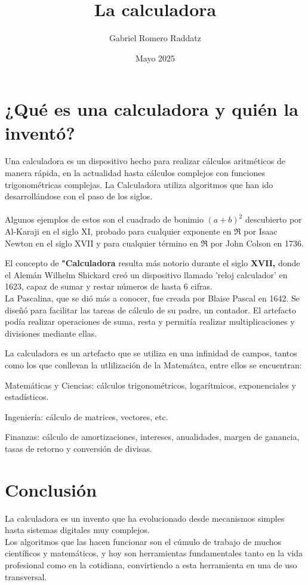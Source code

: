 \documentclass[12pt]{article}
\title{\textbf{\huge La calculadora}}
\author{ Gabriel Romero Raddatz}
\date{Mayo 2025}
\begin{document}
\maketitle

\section{¿Qué es una calculadora y quién la inventó?}

\begin{flushleft}
    
Una calculadora es un dispositivo hecho para realizar cálculos aritméticos de manera rápida, en la actualidad hasta cálculos complejos con funciones trigonométricas complejas. La Calculadora utiliza algoritmos que han ido desarrollándose con el paso de los siglos. \\
\\
Algunos ejemplos de estos son el cuadrado de bonimio $(a+b)^{2}$  descubierto por Al-Karaji en el siglo XI, probado para cualquier exponente en $\Re$ por Isaac Newton en el siglo XVII y para cualquier término en $\Re$ por John Colson en 1736. 


El concepto de \textbf{"Calculadora} resulta más notorio durante el siglo \textbf{XVII, } donde el Alemán Wilhelm Shickard creó un dispositivo llamado 'reloj calculador' en 1623, capaz de sumar y restar números de hasta 6 cifras. \\


La Pascalina, que se dió más a conocer, fue creada por Blaise Pascal en 1642. Se diseñó para facilitar las tareas de cálculo de su padre, un contador. El artefacto podía realizar operaciones de suma, resta y permitía realizar multiplicaciones y divisiones mediante ellas.





La calculadora es un artefacto que se utiliza en una infinidad de campos, tantos como los que conllevan la utlilización de la Matemátca, entre ellos se encuentran:  


Matemáticas y Ciencias: cálculos trigonométricos, logarítmicos, exponenciales y estadísticos.


Ingeniería: cálculo de matrices, vectores, etc.

Finanzas: cálculo de amortizaciones, intereses, anualidades, margen de ganancia, tasas de retorno y conversión de divisas.



\section{Conclusión}
La calculadora es un invento que ha evolucionado desde mecanismos simples hasta sistemas digitales muy complejos. \\
Los algoritmos que las hacen funcionar son el cúmulo de trabajo de muchos científicos y matemáticos, y hoy son herramientas fundamentales tanto en la vida profesional como en la cotidiana, convirtiendo a esta herramienta en una de uso transversal.



\end{flushleft}
\end{document}
